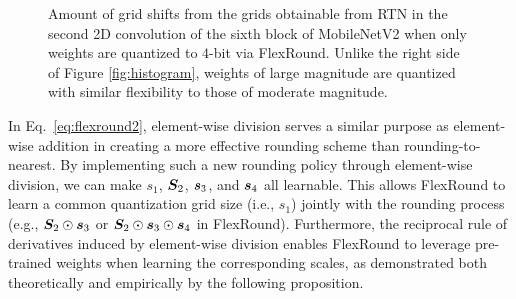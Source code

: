 \documentclass{article}
\theoremstyle{plain}
\theoremstyle{definition}
\theoremstyle{remark}
\begin{document}
\begin{figure}
    \vskip -0.1in
    \centering
    \vskip -0.1in
    \caption{Amount of grid shifts from the grids obtainable from RTN in the second 2D convolution of the sixth block of MobileNetV2 when only weights are quantized to $4$-bit via FlexRound. Unlike the right side of Figure \ref{fig:histogram}, weights of large magnitude are quantized with similar flexibility to those of moderate magnitude.}
    \label{fig:B}
    \vskip -0.2in
\end{figure}


In Eq.~\ref{eq:flexround2}, element-wise division serves a similar purpose as element-wise addition in creating a more effective rounding scheme than rounding-to-nearest. By implementing such a new rounding policy through element-wise division, we can make $s_1$, ${\bm{S}}_2$, ${\bm{s}}_3$, and ${\bm{s}}_4$ all learnable. This allows FlexRound to learn a common quantization grid size (i.e., $s_1$) jointly with the rounding process (e.g., ${\bm{S}}_2 \odot {\bm{s}}_3$ or ${\bm{S}}_2 \odot {\bm{s}}_3 \odot {\bm{s}}_4$ in FlexRound). Furthermore, the reciprocal rule of derivatives induced by element-wise division enables FlexRound to leverage pre-trained weights when learning the corresponding scales, as demonstrated both theoretically and empirically by the following proposition.

\end{document}
